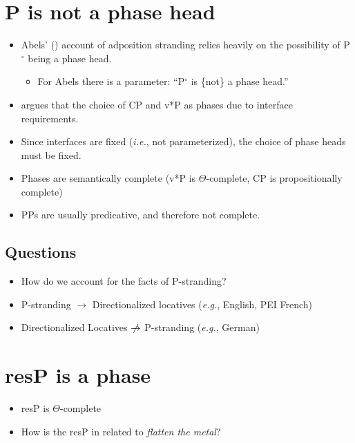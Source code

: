 \documentclass[letterpaper]{article}
\begin{document}
\section{P is not a phase head}
\begin{itemize}
  \item Abels' (\citeyear{abels2003successive}) account of adposition stranding relies heavily on the possibility of P$^\circ$ being a phase head.
    \begin{itemize}
      \item For Abels there is a parameter: ``P$^\circ$ is \{not\} a phase head.''
    \end{itemize}
  \item \textcite{chomsky2008on} argues that the choice of CP and v*P as phases due to interface requirements.
  \item Since interfaces are fixed (\textit{i.e.}, not parameterized), the choice of phase heads must be fixed.
  \item Phases are semantically complete (v*P is $\Theta$-complete, CP is propositionally complete)
  \item PPs are usually predicative, and therefore not complete.
\end{itemize}
\subsection{Questions}
\begin{itemize}
  \item How do we account for the facts of P-stranding?
  \item P-stranding $\rightarrow$ Directionalized locatives (\textit{e.g.}, English, PEI French)
  \item Directionalized Locatives $\centernot\rightarrow$ P-stranding (\textit{e.g.}, German)
\end{itemize}
\section{resP is a phase}
\begin{itemize}
  \item resP is $\Theta$-complete
  \item How is the resP in \Last related to \textit{flatten the metal}?
\end{itemize}
\end{document}

